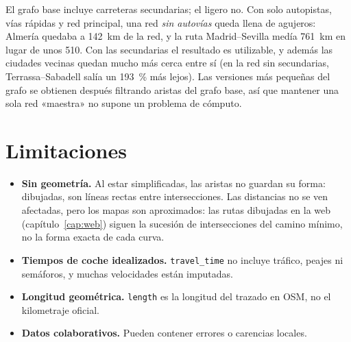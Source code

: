 El grafo base incluye carreteras secundarias; el ligero no. Con solo autopistas, vías rápidas y red principal, una red \emph{sin autovías} queda llena de agujeros: Almería quedaba a 142~km de la red, y la ruta
Madrid--Sevilla medía 761~km en lugar de unos 510. Con las secundarias el resultado es utilizable, y además las ciudades vecinas quedan mucho más cerca entre sí (en la red sin secundarias, Terrassa--Sabadell salía un 193~\% más lejos).
Las versiones más pequeñas del grafo se obtienen después filtrando aristas del grafo base, así que mantener una sola red «maestra» no supone un problema de cómputo.

\section{Limitaciones}

\begin{itemize}
  \item \textbf{Sin geometría.} Al estar simplificadas, las aristas no guardan su forma: dibujadas, son líneas rectas entre intersecciones. Las distancias no se ven afectadas, pero los mapas son aproximados: las rutas
        dibujadas en la web (capítulo~\ref{cap:web}) siguen la sucesión de intersecciones del camino mínimo, no la forma exacta de cada curva.
  \item \textbf{Tiempos de coche idealizados.} \texttt{travel\_time} no incluye tráfico, peajes ni semáforos, y muchas velocidades están imputadas.
  \item \textbf{Longitud geométrica.} \texttt{length} es la longitud del trazado en OSM, no el kilometraje oficial.
  \item \textbf{Datos colaborativos.} Pueden contener errores o carencias locales.
\end{itemize}
